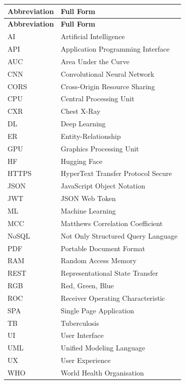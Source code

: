 \documentclass[12pt, a4paper, oneside]{report}
\begin{document}
\begin{longtable}{p{3.5cm} p{10cm}}
\toprule
\textbf{Abbreviation} & \textbf{Full Form} \\
\midrule
\endfirsthead
\toprule
\textbf{Abbreviation} & \textbf{Full Form} \\
\midrule
\endhead

AI & Artificial Intelligence \\
API & Application Programming Interface \\
AUC & Area Under the Curve \\
CNN & Convolutional Neural Network \\
CORS & Cross-Origin Resource Sharing \\
CPU & Central Processing Unit \\
CXR & Chest X-Ray \\
DL & Deep Learning \\
ER & Entity-Relationship \\
GPU & Graphics Processing Unit \\
HF & Hugging Face \\
HTTPS & HyperText Transfer Protocol Secure \\
JSON & JavaScript Object Notation \\
JWT & JSON Web Token \\
ML & Machine Learning \\
MCC & Matthews Correlation Coefficient \\
NoSQL & Not Only Structured Query Language \\
PDF & Portable Document Format \\
RAM & Random Access Memory \\
REST & Representational State Transfer \\
RGB & Red, Green, Blue \\
ROC & Receiver Operating Characteristic \\
SPA & Single Page Application \\
TB & Tuberculosis \\
UI & User Interface \\
UML & Unified Modeling Language \\
UX & User Experience \\
WHO & World Health Organisation \\
\bottomrule
\end{longtable}

\newpage
{}
\end{document}
